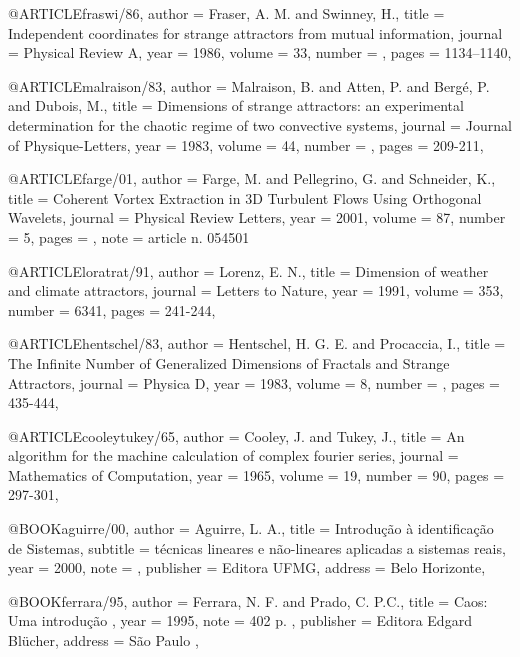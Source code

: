 @ARTICLE{fraswi/86,
author 		= {Fraser, A. M. and Swinney, H.},
title 		= {Independent coordinates for strange attractors from mutual information},
journal 	= {Physical Review A},
year 			= {1986},
volume 		= {33},
number    = {},
pages     = {1134--1140},
}


@ARTICLE{malraison/83,
author 		= {Malraison, B. and Atten, P. and Berg\'e, P. and Dubois, M.},
title 		= {Dimensions of strange attractors: an experimental determination for the chaotic regime of two convective systems},
journal 	= {Journal of Physique-Letters},
year 			= {1983},
volume 		= {44},
number    = {},
pages     = {209-211},
}


@ARTICLE{farge/01,
author 		= {Farge, M. and Pellegrino, G. and Schneider, K.},
title		  = {Coherent Vortex Extraction in 3D Turbulent Flows Using Orthogonal Wavelets},
journal 	= {Physical Review Letters},
year 			= {2001},
volume 		= {87},
number    = {5},
pages 		= {},
note      = {article n. 054501}
} 

@ARTICLE{loratrat/91,
author 		= {Lorenz, E. N.},
title		  = {Dimension of weather and climate attractors},
journal  	= {Letters to Nature},
year 			= {1991},
volume 		= {353},
number    = {6341},
pages   	= {241-244},
} 

@ARTICLE{hentschel/83,
author 		= {Hentschel, H. G. E. and Procaccia, I.},
title		  = {The Infinite Number of Generalized Dimensions of Fractals and Strange Attractors},
journal 	= {Physica D},
year 			= {1983},
volume 		= {8},
number    = {},
pages 		= {435-444},
} 

@ARTICLE{cooleytukey/65,
author 		= {Cooley, J. and Tukey, J.},
title		  = {An algorithm for the machine calculation of complex fourier series},
journal 	= {Mathematics of Computation},
year 			= {1965},
volume 		= {19},
number    = {90},
pages 		= {297-301},
} 

@BOOK{aguirre/00,
author              = {Aguirre, L. A.},
title               = {Introdução à identificação de {S}istemas},
subtitle            = {técnicas lineares e não-lineares aplicadas a sistemas reais},
year                = {2000},
note                = { },
publisher           = { Editora UFMG},
address             = {Belo Horizonte},
}

@BOOK{ferrara/95,
author              = {Ferrara, N. F. and Prado, C. P.C.},
title               = { Caos: Uma introdu{\c c}\~ao },
year                = 1995,
note                = {402 p. },
publisher           = {Editora Edgard Bl\"ucher},
address             = { S\~ao Paulo },
}

